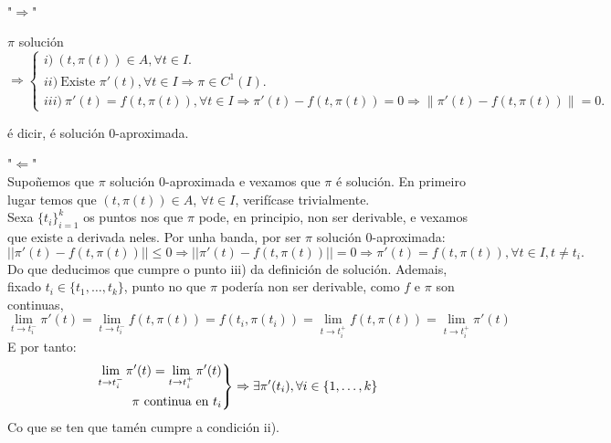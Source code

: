 \documentclass[11pt, a4paper,twoside]{article}
\makeatletter
\theoremstyle{theorem-style}  %
\renewenvironment{proof}[1][\proofname]{\par
	\pushQED{\qed}%
	\normalfont \topsep6\p@\@plus6\p@\relax
	\list{}{%
		\settowidth{\leftmargin}{\quad:\hskip\labelsep}%
		\setlength{\labelwidth}{0pt}%
		\setlength{\itemindent}{-\leftmargin}%
	}%
	\item[\hskip\labelsep\itshape#1\@addpunct{:}]\ignorespaces
}{%
	\popQED\endlist\@endpefalse
}
\theoremstyle{definition-style}
\theoremstyle{example-style}
\providecommand{\norm}[1]{\left\lVert#1\right\rVert} %
\newenvironment{rcases}
{\left.\begin{aligned}}
	{\end{aligned}\right\rbrace}
\makeatother
\begin{document}
\begin{proof}\ \\
	"$ \Rightarrow $"
	
	$ \pi $	solución $\Rightarrow \begin{cases}
	i)\  (t, \pi (t)) \in A, \forall t \in I.\\
	ii)\  \text{Existe }  \pi' (t), \forall t \in I \Rightarrow \pi \in C^1(I). \\
	iii)\  \pi'(t)=f(t, \pi(t)),  \forall t \in I \Rightarrow \pi'(t)-f(t, \pi(t))=0 \Rightarrow \norm{\pi'(t)-f(t, \pi(t))}=0.
	\end{cases}$ 
	
	é dicir, é solución 0-aproximada.
	
	"$ \Leftarrow $" \\Supoñemos que $ \pi $ solución 0-aproximada e vexamos que $ \pi $ é solución. En primeiro lugar temos que $(t, \pi (t)) \in A$, $\forall t \in I$, verifícase trivialmente. \\
	Sexa $ \{t_i\}_{i=1}^k $ os puntos nos que $ \pi $ pode, en principio, non ser derivable, e vexamos que existe a derivada neles. Por unha banda, por ser  $ \pi $ solución 0-aproximada:
	 \[ ||\pi'(t)-f(t,\pi(t))||\leq 0\Rightarrow ||\pi'(t)-f(t,\pi(t))||=0 \Rightarrow \pi'(t)=f(t, \pi(t)), \forall t \in I, t\neq t_i.\]
	Do que deducimos que cumpre o punto iii) da definición de solución. Ademais, fixado $ t_i\in \{t_1, \dots, t_k\} $, punto no que $ \pi $ podería non ser derivable, como $ f $ e $ \pi $ son continuas, 
	\[ \lim\limits_{t\rightarrow t_i^-}\pi'(t)=\lim\limits_{t\rightarrow t_i^-} f(t, \pi(t))= f(t_i, \pi(t_i))= \lim\limits_{t\rightarrow t_i^+} f(t, \pi(t))=\lim\limits_{t\rightarrow t_i^+}\pi'(t)\]
	E por tanto:
	\[ \begin{rcases}
	\lim\limits_{t\rightarrow t_i^-}\pi'(t)=\lim\limits_{t\rightarrow t_i^+}\pi'(t) \\
	\pi \text{ continua en } t_i
	\end{rcases}\Rightarrow \exists \pi'(t_i), \forall i \in \{1,\dots,k \} \]
	Co que se ten que tamén cumpre a condición ii).	
\end{proof}
\end{document}
